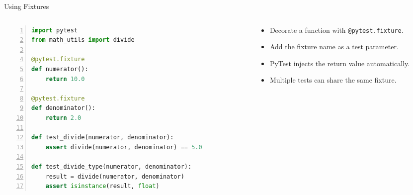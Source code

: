 {}
{}
{}

\begin{frame}{Using Fixtures}
\setlength{\leftmargini}{0.5cm}
\begin{columns}[c,t,totalwidth=1.0\textwidth]
\begin{column}[c]{0.49\linewidth}
\begin{lstlisting}[style=fullwidth,language=python,numbers=left]
import pytest
from math_utils import divide

@pytest.fixture
def numerator():
    return 10.0

@pytest.fixture
def denominator():
    return 2.0

def test_divide(numerator, denominator):
    assert divide(numerator, denominator) == 5.0

def test_divide_type(numerator, denominator):
    result = divide(numerator, denominator)
    assert isinstance(result, float)
\end{lstlisting}
\end{column}
\begin{column}[c]{0.49\linewidth}
\begin{block}{}
\begin{itemize}
\item Decorate a function with \texttt{@pytest.fixture}.
\item Add the fixture name as a test parameter.
\item PyTest injects the return value automatically.
\item Multiple tests can share the same fixture.
\end{itemize}
\end{block}
\end{column}
\end{columns}
\end{frame}

